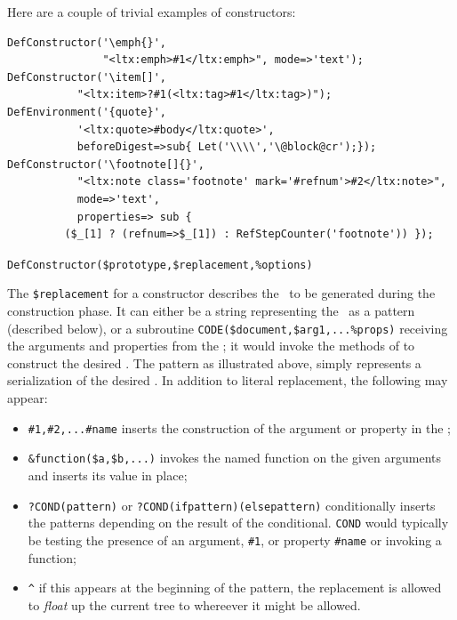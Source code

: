 \documentclass{book}
\newcommand{\ltxcode}{\lstinline[style=latexml]}
\begin{document}
Here are a couple of trivial examples of constructors:
\begin{lstlisting}[style=latexml]
DefConstructor('\emph{}',
               "<ltx:emph>#1</ltx:emph>", mode=>'text');
DefConstructor('\item[]',
	       "<ltx:item>?#1(<ltx:tag>#1</ltx:tag>)");
DefEnvironment('{quote}',   
	       '<ltx:quote>#body</ltx:quote>',
	       beforeDigest=>sub{ Let('\\\\','\@block@cr');});
DefConstructor('\footnote[]{}',
	       "<ltx:note class='footnote' mark='#refnum'>#2</ltx:note>",
	       mode=>'text',
	       properties=> sub { 
		 ($_[1] ? (refnum=>$_[1]) : RefStepCounter('footnote')) });
\end{lstlisting}

\par\noindent\ltxcode|DefConstructor($prototype,$replacement,%
\par
The  \ltxcode|$replacement| for a constructor describes the \XML\ to
be generated during the construction phase. It can either be a string
representing the \XML\ as a pattern (described below), or a
subroutine \ltxcode|CODE($document,$arg1,...%
receiving the arguments and properties from the ;
it would invoke the methods of  to construct the desired \XML.
The pattern as illustrated above, simply represents a serialization of the
desired \XML.  In addition to literal replacement, the following may appear:
\begin{itemize}
\item \ltxcode|#1,#2,...#name| inserts the construction of the argument
or property in the \XML;
\item \ltxcode|&function($a,$b,...)| invokes the named function on the
given arguments and inserts its value in place;
\item \ltxcode|?COND(pattern)| or \ltxcode|?COND(ifpattern)(elsepattern)|
conditionally inserts the patterns depending on the result of the conditional.
\texttt{COND} would typically be testing the presence of an argument, \ltxcode|#1|,
or property \ltxcode|#name| or invoking a function;
\item \ltxcode|^| if this appears at the beginning of the pattern,
the replacement is allowed to \emph{float} up the current tree to whereever
it might be allowed.
\end{itemize}
\end{document}
